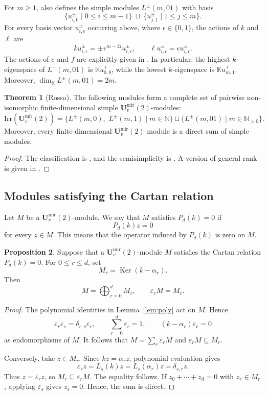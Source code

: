 \documentclass[12pt]{amsart}
\numberwithin{equation}{section}
\theoremstyle{definition}
\newtheorem{theorem}{Theorem}[section]
\newtheorem{proposition}[theorem]{Proposition}
\theoremstyle{definition}
\newcommand{\kk}{\mathbb K}
\newcommand{\Umir}{\mathbf U^{\mathrm{mir}}_v(2)}
\newcommand{\eps}{\varepsilon}
\newcommand{\Ker}{\operatorname{Ker}}
\begin{document}
For $m\ge1$, \cite[Proposition~5.4]{Ros18} also defines the simple modules $L^{\pm}(m,01)$ with basis
$$
\{u^{\pm}_{i,0}\mid0\le i\le m-1\}
\ \sqcup\
\{u^{\pm}_{j,1}\mid1\le j\le m\}.
$$
For every basis vector $u^{\pm}_{i,\epsilon}$ occurring above, where $\epsilon\in\{0,1\}$, the actions of $k$ and $\ell$ are
$$
ku^{\pm}_{i,\epsilon}=\pm v^{m-2i}u^{\pm}_{i,\epsilon},
\qquad
\ell u^{\pm}_{i,\epsilon}=\epsilon u^{\pm}_{i,\epsilon}.
$$
The actions of $e$ and $f$ are explicitly given in \cite[Proposition~5.4]{Ros18}. In particular, the highest $k$-eigenspace of $L^+(m,01)$ is $\kk u^+_{0,0}$, while the lowest $k$-eigenspace is $\kk u^+_{m,1}$. Moreover, $\dim_{\kk}L^{\pm}(m,01)=2m$.

\begin{theorem}[Rosso]\label{thm:rossosimple}
The following modules form a complete set of pairwise non-isomorphic finite-dimensional simple $\Umir$-modules:
$$
\mathrm{Irr}(\Umir)=\{L^{\pm}(m,0),\,\,L^{\pm}(m,1)\mid m\in\mathbb N\} \sqcup \{L^{\pm}(m,01)\mid m\in\mathbb N_{>0}\}.
$$
Moreover, every finite-dimensional $\Umir$-module is a direct sum of simple modules.
\end{theorem}
\begin{proof}
The classification is \cite[Theorem~5.8]{Ros18}, and the semisimplicity is \cite[Theorem~5.13]{Ros18}.  A version of general rank is given in \cite{GR26}.
\end{proof}


\subsection{Modules satisfying the Cartan relation}\label{subsec:kmodules}

Let $M$ be a $\Umir$-module. We say that $M$ satisfies $P_d(k)=0$ if
$$
P_d(k)z=0
$$
for every $z\in M$. This means that the operator induced by $P_d(k)$ is zero on $M$.

\begin{proposition}\label{prop:kdecomp}
Suppose that a $\Umir$-module $M$ satisfies the Cartan relation $P_d(k)=0$. For $0\le r\le d$, set
$$
M_r=\Ker(k-\alpha_r).
$$
Then
$$
M=\bigoplus_{r=0}^{d}M_r,
\qquad
\eps_rM=M_r.
$$
\end{proposition}
\begin{proof}
The polynomial identities in Lemma~\ref{lem:poly} act on $M$. Hence
$$
\eps_r\eps_s=\delta_{r,s}\eps_r,
\qquad
\sum_{r=0}^{d}\eps_r=1,
\qquad
(k-\alpha_r)\eps_r=0
$$
as endomorphisms of $M$. It follows that $M=\sum_r\eps_rM$ and $\eps_rM\subseteq M_r$.

Conversely, take $z\in M_r$. Since $kz=\alpha_rz$, polynomial evaluation gives
$$
\eps_sz=L_s(k)z=L_s(\alpha_r)z=\delta_{s,r}z.
$$
Thus $z=\eps_rz$, so $M_r\subseteq\eps_rM$. The equality follows. If $z_0+\cdots+z_d=0$ with $z_r\in M_r$, applying $\eps_s$ gives $z_s=0$. Hence, the sum is direct.
\end{proof}
\end{document}
